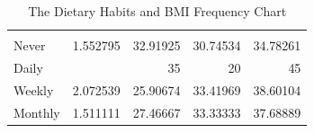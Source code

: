 \documentclass{article}
\begin{document}
\begin{table}[!h]
{\begin{tabular}{lllll}
			\multicolumn{1}{|r}{} &
			\multicolumn{1}{r}{} &
			\multicolumn{1}{r}{} &
			\multicolumn{1}{r}{} \\
			\multicolumn{1}{l}{\hspace{5em}Never} &
			\multicolumn{1}{|r}{1.552795} &
			\multicolumn{1}{r}{32.91925} &
			\multicolumn{1}{r}{30.74534} &
			\multicolumn{1}{r}{34.78261} \\
			\multicolumn{1}{l}{\hspace{5em}Daily} &
			\multicolumn{1}{|r}{} &
			\multicolumn{1}{r}{35} &
			\multicolumn{1}{r}{20} &
			\multicolumn{1}{r}{45} \\
			\multicolumn{1}{l}{\hspace{5em}Weekly} &
			\multicolumn{1}{|r}{2.072539} &
			\multicolumn{1}{r}{25.90674} &
			\multicolumn{1}{r}{33.41969} &
			\multicolumn{1}{r}{38.60104} \\
			\multicolumn{1}{l}{\hspace{5em}Monthly} &
			\multicolumn{1}{|r}{1.511111} &
			\multicolumn{1}{r}{27.46667} &
			\multicolumn{1}{r}{33.33333} &
			\multicolumn{1}{r}{37.68889} \\
			\cline{1-5}
		\end{tabular}		
	}
	\caption{The Dietary Habits and BMI Frequency Chart}
	\label{tab:t5}
\end{table}
\end{document}
